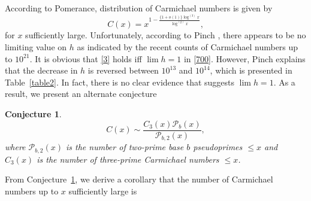 \documentclass[11pt]{article}
\theoremstyle{plain}
\newtheorem{conj}[subsubsection]{Conjecture}
\theoremstyle{definition}
\theoremstyle{remark}
\numberwithin{equation}{subsection}
\begin{document}
According to Pomerance, distribution of Carmichael numbers is given by
\begin{equation} \label{3}
C(x) = x^{1-{\frac{\{1+o(1)\}\log^{(3)} x}{\log^{(2)} x}}},
\end{equation}
for $x$ sufficiently large. Unfortunately, according to Pinch \cite{19}, there appears to be no limiting value on $h$ as indicated by the recent counts of Carmichael numbers up to $10^{21}$. It is obvious that \eqref{3} holds iff $\lim h = 1$ in \eqref{700}. However, Pinch \cite{19} explains that the decrease in $h$ is reversed between $10^{13}$ and $10^{14}$, which is presented in Table~\ref{table2}. In fact, there is no clear evidence that suggests $\lim h = 1$. \newline
\indent As a result, we present an alternate conjecture
\begin{conj} \label{result1}
\begin{equation} \label{4}
C(x) \sim \frac{C_3(x) \mathscr{P}_{b}(x)}{\mathscr{P}_{b,2}(x)},
\end{equation}
where $\mathscr{P}_{b,2}(x)$ is the number of two-prime base $b$ pseudoprimes $\le x$ and $C_3(x)$ is the number of three-prime Carmichael numbers $\le x$.
\end{conj}
\indent From Conjecture~\ref{result1}, we derive a corollary that the number of Carmichael numbers up to $x$ sufficiently large is
\end{document}
